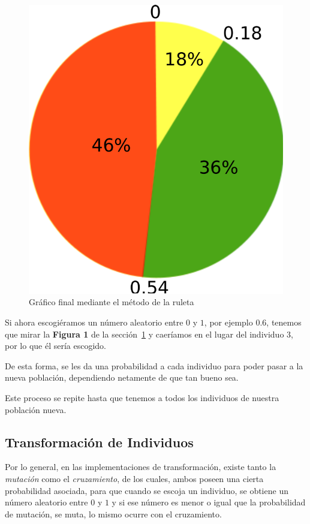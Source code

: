 \begin{figure}[htb!]
	\begin{center}
	\includegraphics[scale=0.4]{img/fig1}
	\end{center}
	\label{fig:fig1}
	\caption{Gr\'afico final mediante el método de la ruleta}
\end{figure}

Si ahora escogiéramos un número aleatorio entre $0$ y $1$, por ejemplo $0.6$, tenemos que mirar la \textbf{Figura 1} de la sección~\ref{fig:fig1} y caeríamos
en el lugar del individuo 3, por lo que él sería escogido.

De esta forma, se les da una probabilidad a cada individuo para poder pasar a la nueva población, dependiendo
netamente de que tan bueno sea.

Este proceso se repite hasta que tenemos a todos los individuos de nuestra población nueva.


\subsection{Transformación de Individuos}

Por lo general, en las implementaciones de transformación, existe tanto la \emph{mutación} como el \emph{cruzamiento},
de los cuales, ambos poseen una cierta probabilidad asociada, para que cuando se escoja un individuo, se obtiene
un número aleatorio entre $0$ y $1$ y si ese número es menor o igual que la probabilidad de mutación, se muta,
lo mismo ocurre con el cruzamiento.

